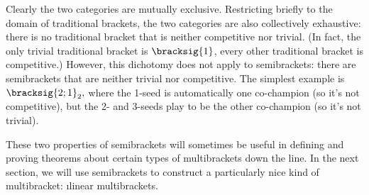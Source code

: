 {    Clearly the two categories are mutually exclusive. Restricting briefly to the domain of traditional brackets, the two categories are also collectively exhaustive: there is no traditional bracket that is neither competitive nor trivial. (In fact, the only trivial traditional bracket is $\bracksig{1}$, every other traditional bracket is competitive.) However, this dichotomy does not apply to semibrackets: there are semibrackets that are neither trivial nor competitive. The simplest example is $\bracksig{2;1}_2,$ where the 1-seed is automatically one co-champion (so it's not competitive), but the 2- and 3-seeds play to be the other co-champion (so it's not trivial).


    These two properties of semibrackets will sometimes be useful in defining and proving theorems about certain types of multibrackets down the line. In the next section, we will use semibrackets to construct a particularly nice kind of multibracket: \i{linear multibrackets.}


}